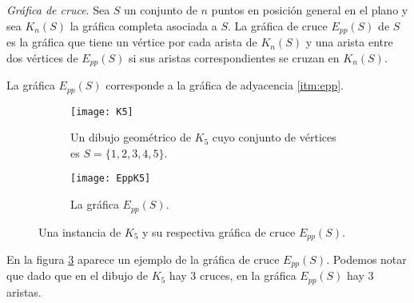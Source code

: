 \begin{definition}{\emph{Gráfica de cruce}.}
  Sea $S$ un conjunto de $n$ puntos en posición general en el plano y sea $K_n(S)$ la gráfica completa
  asociada a $S$. La gráfica de cruce $E_{pp}(S)$ de $S$ es la gráfica que tiene un vértice
  por cada arista de $K_n(S)$ y una arista entre dos vértices de $E_{pp}(S)$ si sus aristas correspondientes
  se cruzan en $K_n(S)$.
\end{definition}

La gráfica $E_{pp}(S)$ corresponde a la gráfica de adyacencia \ref{itm:epp}.
\begin{figure}
\begin{subfigure}{.5\textwidth}
  \centering
  \texttt{[image: K5]}
  \caption{Un dibujo geométrico de $K_5$ cuyo conjunto de vértices es $S=\{1,2,3,4,5\}$.}
  \label{fig:k5}
\end{subfigure}%
\begin{subfigure}{.5\textwidth}
  \centering
  \texttt{[image: EppK5]}
  \caption{La gráfica $E_{pp}(S)$.}
  \label{fig:eppk5}
\end{subfigure}
\caption{Una instancia de $K_5$ y su respectiva gráfica de cruce $E_{pp}(S)$.}
\label{fig:ejemploeppk5}
\end{figure}

En la figura \ref{fig:ejemploeppk5} aparece un ejemplo de la gráfica de cruce $E_{pp}(S)$.
Podemos notar que dado que en el dibujo de $K_5$ hay 3 cruces, en la gráfica $E_{pp}(S)$
hay 3 aristas.

